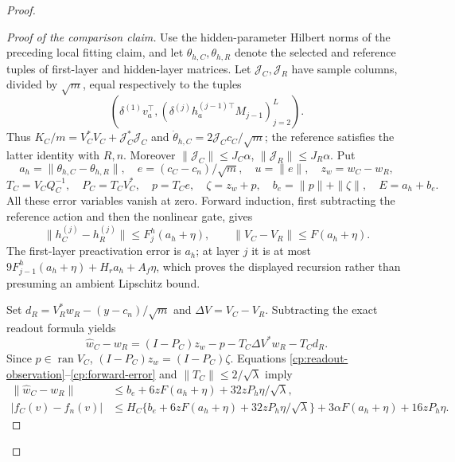 \begin{proof}
\begin{proof}[Proof of the comparison claim]
Use the hidden-parameter Hilbert norms of the preceding local fitting claim,
and let $\theta_{h,C},\theta_{h,R}$ denote the selected and reference tuples
of first-layer and hidden-layer matrices. Let
$\mathcal J_C,\mathcal J_R$ have sample columns, divided by $\sqrt m$,
equal respectively to the tuples
\[
 (\delta^{(1)}v_a^\top,
       (\delta^{(j)}h_a^{(j-1)\top}M_{j-1})_{j=2}^L).
\]
Thus $K_C/m=V_C^*V_C+\mathcal J_C^*\mathcal J_C$ and
$\dot\theta_{h,C}=2\mathcal J_Cc_C/\sqrt m$; the reference satisfies
the latter identity with $R,n$. Moreover
$\|\mathcal J_C\|\le J_C\alpha$,
$\|\mathcal J_R\|\le J_R\alpha$.
Put
\[
 a_h=\|\theta_{h,C}-\theta_{h,R}\|,\quad
 e=(c_C-c_n)/\sqrt m,\quad u=\|e\|,\quad z_w=w_C-w_R,
\]
\[
 T_C=V_CQ_C^{-1},\quad P_C=T_CV_C^*,\quad
 p=T_Ce,\quad \zeta=z_w+p,\quad b_e=\|p\|+\|\zeta\|,
 \quad E=a_h+b_e.
\]
All these error variables vanish at zero. Forward induction, first
subtracting the reference action and then the nonlinear gate, gives
\begin{equation}
 \|h_C^{(j)}-h_R^{(j)}\|\le F_j^h(a_h+\eta),
 \qquad \|V_C-V_R\|\le F(a_h+\eta).
 \label{cp:forward-error}
\end{equation}
The first-layer preactivation error is $a_h$; at layer $j$ it is at
most $9F_{j-1}^h(a_h+\eta)+H_ra_h+A_f\eta$, which proves the displayed
recursion rather than presuming an ambient Lipschitz bound.

Set $d_R=V_R^*w_R-(y-c_n)/\sqrt m$ and $\Delta V=V_C-V_R$.
Subtracting the exact readout formula yields
\begin{equation}
 \widehat w_C-w_R=(I-P_C)z_w-p-T_C\Delta V^*w_R-T_Cd_R.
 \label{cp:readout-deficit}
\end{equation}
Since $p\in\operatorname{ran}V_C$, $(I-P_C)z_w=(I-P_C)\zeta$.
Equations \eqref{cp:readout-observation}--\eqref{cp:forward-error} and
$\|T_C\|\le2/\sqrt\lambda$ imply
\begin{align}
 \|\widehat w_C-w_R\|&\le b_e+6zF(a_h+\eta)
                                      +32zP_h\eta/\sqrt\lambda,
 \label{cp:readout-error}\\
 |f_C(v)-f_n(v)|&\le H_C\{b_e+6zF(a_h+\eta)
                         +32zP_h\eta/\sqrt\lambda\}
                     +3\alpha F(a_h+\eta)+16zP_h\eta.
 \label{cp:output-error}
\end{align}


\end{proof}
\end{proof}
